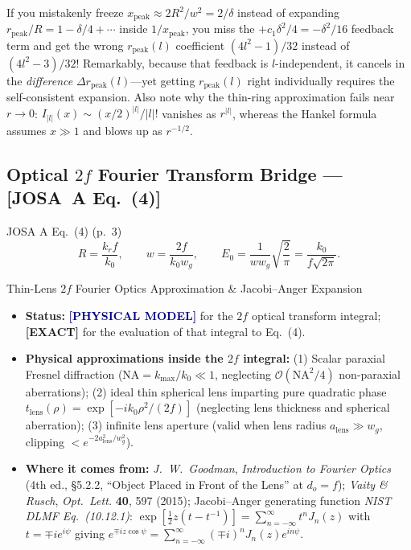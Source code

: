 \documentclass[10pt,letterpaper]{article}
\newcommand{\abs}[1]{\lvert #1 \rvert}
\newcommand{\josa}[1]{\textbf{[JOSA~A Eq.~(#1)]}}
\newcommand{\tagexact}{\textcolor{forest}{\textbf{[EXACT]}}}
\newcommand{\tagmodel}{\textcolor{navy}{\textbf{[PHYSICAL MODEL]}}}
\numberwithin{equation}{section}
\begin{document}
\begin{learnbox}
If you mistakenly freeze $x_{\mathrm{peak}} \approx 2R^2/w^2 = 2/\delta$ instead of expanding $r_{\mathrm{peak}}/R = 1 - \delta/4 + \cdots$ inside $1/x_{\mathrm{peak}}$, you miss the $+c_1\delta^2/4 = -\delta^2/16$ feedback term and get the wrong $r_{\mathrm{peak}}(l)$ coefficient $(4l^2-1)/32$ instead of $(4l^2-3)/32$! Remarkably, because that feedback is $l$-independent, it cancels in the \emph{difference} $\Delta r_{\mathrm{peak}}(l)$---yet getting $r_{\mathrm{peak}}(l)$ right individually requires the self-consistent expansion. Also note why the thin-ring approximation fails near $r \to 0$: $I_{\abs{l}}(x) \sim (x/2)^{\abs{l}}/\abs{l}!$ vanishes as $r^{\abs{l}}$, whereas the Hankel formula assumes $x \gg 1$ and blows up as $r^{-1/2}$.
\end{learnbox}

\subsection{Optical $2f$ Fourier Transform Bridge --- \josa{4}}

\begin{targeteq}{JOSA A Eq.~(4) (p.~3)}
\[
  R = \frac{k_r f}{k_0}, \qquad w = \frac{2f}{k_0 w_g}, \qquad E_0 = \frac{1}{w w_g}\sqrt{\frac{2}{\pi}} = \frac{k_0}{f\sqrt{2\pi}}.
\]
\end{targeteq}

\begin{approxbox}{Thin-Lens $2f$ Fourier Optics Approximation \& Jacobi--Anger Expansion}
\begin{itemize}[leftmargin=1.4em,itemsep=2pt,topsep=1pt]
  \item \textbf{Status:} \tagmodel{} for the $2f$ optical transform integral; \tagexact{} for the evaluation of that integral to Eq.~(4).
  \item \textbf{Physical approximations inside the $2f$ integral:} (1) Scalar paraxial Fresnel diffraction ($\mathrm{NA} = k_{\max}/k_0 \ll 1$, neglecting $\mathcal{O}(\mathrm{NA}^2/4)$ non-paraxial aberrations); (2) ideal thin spherical lens imparting pure quadratic phase $t_{\mathrm{lens}}(\rho) = \exp[-i k_0 \rho^2/(2f)]$ (neglecting lens thickness and spherical aberration); (3) infinite lens aperture (valid when lens radius $a_{\mathrm{lens}} \gg w_g$, clipping $< e^{-2a_{\mathrm{lens}}^2/w_g^2}$).
  \item \textbf{Where it comes from:} \emph{J.\ W.\ Goodman}, \emph{Introduction to Fourier Optics} (4th ed., \S5.2.2, ``Object Placed in Front of the Lens'' at $d_o = f$); \emph{Vaity \& Rusch}, \emph{Opt.\ Lett.} \textbf{40}, 597 (2015); Jacobi--Anger generating function \emph{NIST DLMF Eq.~(10.12.1)}: $\exp[\frac{1}{2}z(t - t^{-1})] = \sum_{n=-\infty}^\infty t^n J_n(z)$ with $t = \mp i e^{i\psi}$ giving $e^{\mp i z\cos\psi} = \sum_{n=-\infty}^\infty (\mp i)^n J_n(z) e^{in\psi}$.
\end{itemize}
\end{approxbox}
\end{document}
